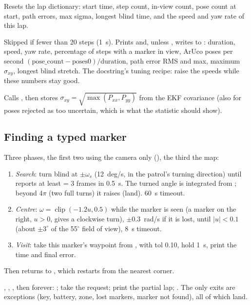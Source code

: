 Resets the lap dictionary: start time, step count, in-view count, pose count at start, path errors, max sigma,
longest blind time, and the speed and yaw rate of this lap.

Skipped if fewer than 20 steps (1~s). Prints and, unless , writes to : duration,
speed, yaw rate, percentage of steps with a marker in view, ArUco poses per second
$(\text{pose\_count} - \text{poses0})/\text{duration}$, path error RMS and max, maximum $\sigma_{xy}$, longest blind
stretch. The docstring's tuning recipe: raise the speeds while these numbers stay good.

Calls , then stores $\sigma_{xy} = \sqrt{\max(P_{xx},P_{yy})}$ from the EKF covariance
(also for poses rejected as too uncertain, which is what the statistic should show).

\subsection{Finding a typed marker}

Three phases, the first two using the camera only (), the third the map:
\begin{enumerate}[nosep]
  \item \emph{Search}: turn blind at $\pm\omega_s$ (12~deg/s, in the patrol's turning direction) until
         reports at least  = 3 frames in 0.5~s. The turned angle is integrated
        from ; beyond $4\pi$ (two full turns) it raises  (land). 60~s timeout.
  \item \emph{Centre}: $\omega = \operatorname{clip}(-1.2u, 0.5)$ while the marker is seen (a marker on the
        right, $u>0$, gives a clockwise turn), $\pm 0.3$~rad/s if it is lost, until $|u| < 0.1$ (about
        $\pm 3^\circ$ of the 55$^\circ$ field of view), 8~s timeout.
  \item \emph{Visit}: take this marker's waypoint from ,  with
        tol 0.10, hold 1~s, print the time and final error.
\end{enumerate}
Then  returns to , which restarts from the nearest corner.

, , , then forever: ; take the request;
print the partial lap; . The only exits are exceptions (key, battery, zone, lost markers,
marker not found), all of which land.


